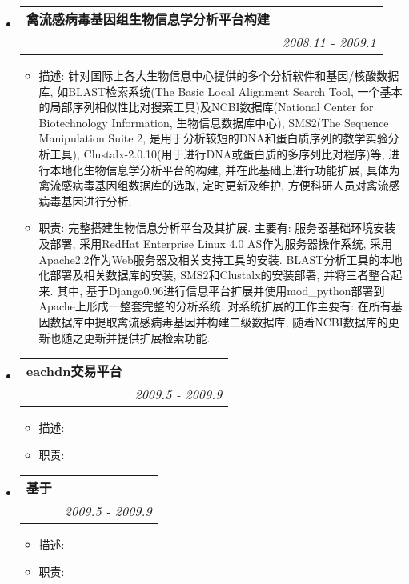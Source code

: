 \documentclass[letterpaper,11pt]{article}
\makeatletter
\newcommand{\resitem}[1]{\item #1 \vspace{-2pt}}
\newcommand{\ressubheading}[4]{
\begin{tabular*}{6.5in}{l@{\extracolsep{\fill}}r}
		\textbf{#1} & #2 \\
		\textit{#3} & \textit{#4} \\
\end{tabular*}\vspace{-6pt}}
\makeatother
\begin{document}
\begin{CJK}{UTF8}{hei}
\begin{itemize}
\item
	\ressubheading{禽流感病毒基因组生物信息学分析平台构建}{}{}{2008.11 - 2009.1}
	\begin{itemize}
		\resitem{	描述: 针对国际上各大生物信息中心提供的多个分析软件和基因/核酸数据库, 如BLAST检索系统(The Basic Local Alignment Search Tool, 一个基本的局部序列相似性比对搜索工具)及NCBI数据库(National Center for Biotechnology Information, 生物信息数据库中心), SMS2(The Sequence Manipulation Suite 2, 是用于分析较短的DNA和蛋白质序列的教学实验分析工具), Clustalx-2.0.10(用于进行DNA或蛋白质的多序列比对程序)等, 进行本地化生物信息学分析平台的构建, 并在此基础上进行功能扩展, 具体为禽流感病毒基因组数据库的选取, 定时更新及维护, 方便科研人员对禽流感病毒基因进行分析.}
		\resitem{	职责: 完整搭建生物信息分析平台及其扩展. 主要有: 服务器基础环境安装及部署, 采用RedHat Enterprise Linux 4.0 AS作为服务器操作系统, 采用Apache2.2作为Web服务器及相关支持工具的安装. BLAST分析工具的本地化部署及相关数据库的安装, SMS2和Clustalx的安装部署, 并将三者整合起来. 其中, 基于Django0.96进行信息平台扩展并使用mod\_python部署到Apache上形成一整套完整的分析系统. 对系统扩展的工作主要有: 在所有基因数据库中提取禽流感病毒基因并构建二级数据库, 随着NCBI数据库的更新也随之更新并提供扩展检索功能.}
	\end{itemize}

\item
	\ressubheading{eachdn交易平台}{}{}{2009.5 - 2009.9}
	\begin{itemize}
		\resitem{	描述: }
		\resitem{	职责: }
	\end{itemize}

\item
	\ressubheading{基于}{}{}{2009.5 - 2009.9}
	\begin{itemize}
		\resitem{	描述: }
		\resitem{	职责: }
	\end{itemize}
\end{itemize}


\end{CJK}
\end{document}
